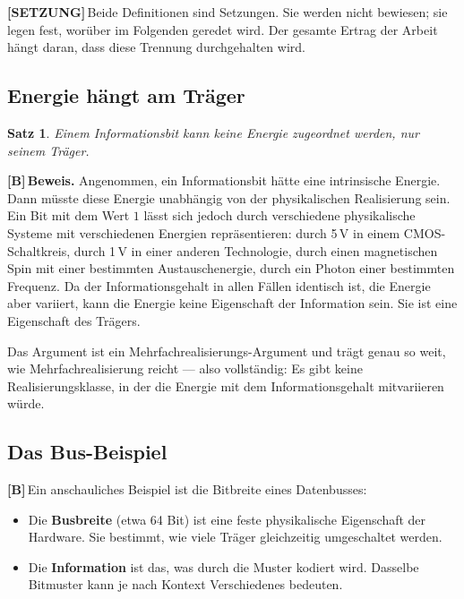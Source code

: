 \documentclass[11pt,a4paper]{article}
\newcommand{\LS}{\textcolor{laySet}{\textbf{\footnotesize\textsf{[SETZUNG]}}}\,}
\newcommand{\LB}{\textcolor{layB}{\textbf{\footnotesize\textsf{[B]}}}\,}
\newcommand{\qedsq}{\raisebox{0.03em}{\framebox[0.62em]{\rule{0pt}{0.42em}}}}
\theoremstyle{ffgft}
\newtheorem{satz}{Satz}
\begin{document}
\LS Beide Definitionen sind Setzungen. Sie werden nicht bewiesen; sie legen fest,
worüber im Folgenden geredet wird. Der gesamte Ertrag der Arbeit hängt daran, dass
diese Trennung durchgehalten wird.

\subsection{Energie hängt am Träger}

\begin{satz}
Einem Informationsbit kann keine Energie zugeordnet werden, nur seinem Träger.
\end{satz}

\LB \textbf{Beweis.} Angenommen, ein Informationsbit hätte eine intrinsische
Energie. Dann müsste diese Energie unabhängig von der physikalischen Realisierung
sein. Ein Bit mit dem Wert $1$ lässt sich jedoch durch verschiedene physikalische
Systeme mit verschiedenen Energien repräsentieren: durch 5\,V in einem
CMOS-Schaltkreis, durch 1\,V in einer anderen Technologie, durch einen
magnetischen Spin mit einer bestimmten Austauschenergie, durch ein Photon einer
bestimmten Frequenz. Da der Informationsgehalt in allen Fällen identisch ist, die
Energie aber variiert, kann die Energie keine Eigenschaft der Information sein.
Sie ist eine Eigenschaft des Trägers. \hfill\qedsq

Das Argument ist ein Mehrfachrealisierungs-Argument und trägt genau so weit, wie
Mehrfachrealisierung reicht --- also vollständig: Es gibt keine
Realisierungsklasse, in der die Energie mit dem Informationsgehalt mitvariieren
würde.

\subsection{Das Bus-Beispiel}

\LB Ein anschauliches Beispiel ist die Bitbreite eines Datenbusses:

\begin{itemize}[leftmargin=1.4em,itemsep=0.25em]
  \item Die \textbf{Busbreite} (etwa 64 Bit) ist eine feste physikalische
        Eigenschaft der Hardware. Sie bestimmt, wie viele Träger gleichzeitig
        umgeschaltet werden.
  \item Die \textbf{Information} ist das, was durch die Muster kodiert wird.
        Dasselbe Bitmuster kann je nach Kontext Verschiedenes bedeuten.
\end{itemize}
\end{document}

